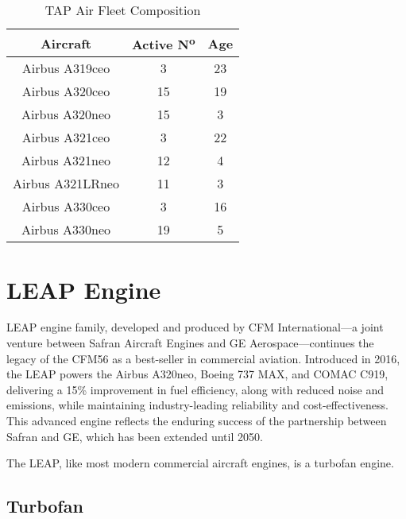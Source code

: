 \begin{table}[h!]
    \caption{\gls{TAP} Air Fleet Composition \cite{aviacaocomercial}}
    \label{tab:tap_aircraft}
    \centering
    \begin{tabular}{ccc}
    \hline
    \textbf{Aircraft} & \textbf{Active N\textsuperscript{o}} & \textbf{Age} \\ \hline
    Airbus A319ceo                 & 3          & 23         \\ 
    Airbus A320ceo                 & 15         & 19         \\ 
    Airbus A320neo              & 15         & 3          \\ 
    Airbus A321ceo                 & 3          & 22         \\ 
    Airbus A321neo              & 12         & 4          \\ 
    Airbus A321LRneo            & 11         & 3          \\ 
    Airbus A330ceo             & 3          & 16         \\ 
    Airbus A330neo          & 19         & 5          \\ \hline
    \end{tabular}
    \end{table}

\section{LEAP Engine}
\label{sec:motor_leap}

\gls{LEAP} engine family, developed and produced by CFM International—a joint venture between Safran Aircraft Engines and GE Aerospace—continues the legacy of the CFM56 as a best-seller in commercial aviation. Introduced in 2016, the LEAP powers the Airbus A320neo, Boeing 737 MAX, and COMAC C919, delivering a 15\% improvement in fuel efficiency, along with reduced noise and emissions, while maintaining industry-leading reliability and cost-effectiveness. This advanced engine reflects the enduring success of the partnership between Safran and GE, which has been extended until 2050.

The \gls{LEAP}, like most modern commercial aircraft engines, is a turbofan engine.

\subsection{Turbofan}
\label{subsec:turbofan}

